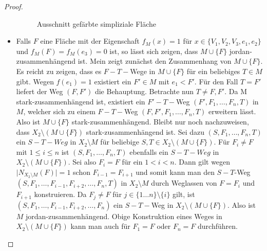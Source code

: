 \documentclass[12pt,titlepage]{article}
\begin{document}
\begin{proof}
\begin{itemize}
\begin{figure}[H]
\caption{Ausschnitt gefärbte simpliziale Fläche}
\end{figure}
\item Falls $F$ eine Fläche mit der Eigenschaft $f_M(x)=1$ für $x \in \{V_1,V_2,V_3,e_1,e_2\}$ und $f_M(F)=f_M(e_3)=0$ ist, so  lässt sich zeigen, dass $M \cup \{F\}$ jordan-zusammenhängend ist. Mein zeigt zunächst den Zusammenhang von $M\cup \{F\}$. Es reicht zu zeigen, dass es $F-T-$Wege in $M\cup \{F\}$ für ein beliebiges $T \in M$ gibt.
Wegen $f(e_1)=1$ existiert ein $F'\in M$ mit $e_1<F'$. Für den Fall $T=F'$ liefert der Weg $(F,F')$ die Behauptung. Betrachte nun $T \neq F,F'$. Da M stark-zusammenhängend ist, existiert ein $F'-T-$Weg $(F',F_1,\ldots,F_n,T)$ in $M$, welcher sich zu einem $F-T-$Weg $(F,F',F_1,\ldots,F_n,T)$ erweitern lässt. Also ist $M \cup \{F\}$ stark-zusammenhängend. Bleibt nur noch nachzuweisen, dass $X_2\setminus (M\cup \{F\})$ stark-zusammenhängend ist. Sei dazu $(S,F_1,\ldots,F_n,T)$ ein $S-T-Weg$ in $X_2 \setminus M $ für  beliebige $S,T \in X_2\setminus ( M\cup \{F\})$. Für $F_i \neq F$ mit $1 \leq i \leq n$ ist $(S,F_1,\ldots,F_n,T)$ ebenfalls ein $S-T-Weg$ in $X_2 \setminus (M \cup \{F\})$. Sei also $F_i=F$ für ein $1< i< n$. Dann gilt wegen $\vert N_{X_2\setminus M}(F) \vert=1$ schon $F_{i-1}=F_{i+1}$ und somit kann man den $S-T$-Weg $(S,F_1,\ldots,F_{i-1},F_{i+2},\ldots,F_n,T)$ in $X_2\setminus M$ durch Weglassen von $F=F_i$ und $F_{i+1}$ konstruieren. Da $F_j\neq F$ für $j \in \{1\ldots n\}\setminus \{i\}$ gilt, ist $(S,F_1,\ldots,F_{i-1},F_{i+2},\ldots,F_n)$ ein $S-T-$Weg in $X_2 \setminus (M \cup \{F\})$. Also ist $M$ jordan-zusammenhängend.
Obige Konstruktion eines Weges in $X_2 \setminus (M \cup \{F\})$ kann man auch für $F_1=F$ oder $F_n=F$ durchführen.
\begin{figure}[H]

\end{figure}
\end{itemize}
\end{proof}
\end{document}
